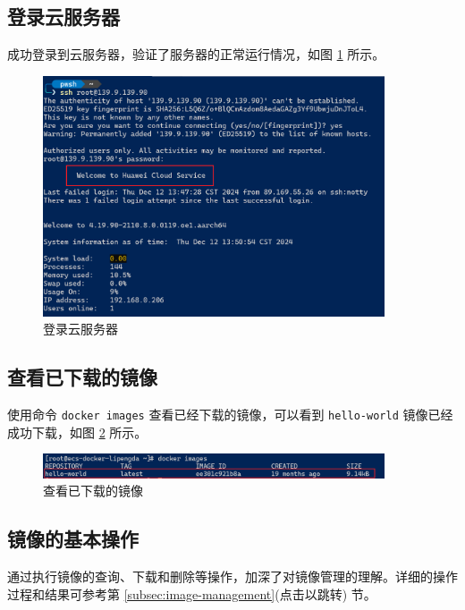 \documentclass{article}
\begin{document}
\subsection{登录云服务器}

成功登录到云服务器，验证了服务器的正常运行情况，如图 \ref{fig:login-server} 所示。

\begin{figure}[H]
\centering
\includegraphics[width=0.9\textwidth]{img/0.2.png}
\caption{登录云服务器}
\label{fig:login-server}
\end{figure}

\subsection{查看已下载的镜像}

使用命令 \texttt{docker images} 查看已经下载的镜像，可以看到 \texttt{hello-world} 镜像已经成功下载，如图 \ref{fig:docker-images} 所示。

\begin{figure}[H]
\centering
\includegraphics[width=0.9\textwidth]{img/0.3.png}
\caption{查看已下载的镜像}
\label{fig:docker-images}
\end{figure}

\subsection{镜像的基本操作}

通过执行镜像的查询、下载和删除等操作，加深了对镜像管理的理解。详细的操作过程和结果可参考第 \ref{subsec:image-management}(点击以跳转) 节。
\end{document}
